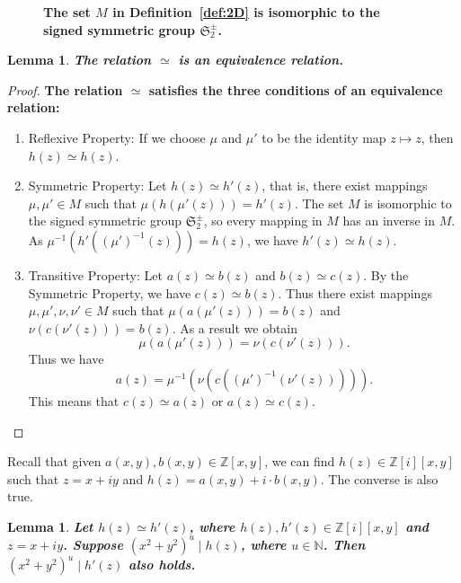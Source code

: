\documentclass[12pt,table]{article}
\newtheorem{lemma}[theorem]{Lemma}
\numberwithin{equation}{section}
\newcommand{\Nnn}{\mathbb N}
\newcommand{\Zzz}{\mathbb Z}
\newcommand{\divides}{\mid}
\begin{document}
\begin{landscape}
{{\begin{figure}[h]
\begin{center}
\end{center}

\caption{
\bf
The set $M$ in Definition~\ref{def:2D} is isomorphic to
the signed symmetric group $ \mathfrak{S}_2^\pm $.
}
 
\label{fig:2D_transformations}
 
\end{figure}



\begin{lemma}
\bf
The relation $ \simeq $ is an equivalence relation.
\end{lemma}

\begin{proof}
\bf
The relation $ \simeq $ satisfies the three conditions of an equivalence relation:
\begin{enumerate}
\item Reflexive Property: If we choose $ \mu $ and $ \mu'$ to be the identity map $ z \mapsto z $, 
then $ h(z) \simeq h(z) $.

\item Symmetric Property: Let  $ h(z) \simeq h'(z) $, that is, there exist mappings 
$ \mu, \mu' \in M $
such that $ \mu( h( \mu'( z ) ) )  = h'(z) $.
The set $M$ is isomorphic to the signed symmetric group $ \mathfrak{S}_2^\pm $,
so every mapping in $M$
has an inverse in $M$. As  $ \mu^{-1}( h'( (\mu')^{-1}( z ) ) )  = h(z) $,
we have $ h'(z) \simeq h(z) $.

\item Transitive Property: Let $ a(z) \simeq b(z) $ and $ b(z) \simeq c(z) $. By the 
Symmetric Property, we have $ c(z) \simeq b(z) $. Thus there exist mappings
$ \mu, \mu', \nu, \nu' \in M $ such that $ \mu( a( \mu'( z ) ) )  = b(z) $ and 
$ \nu( c( \nu'( z ) ) )  = b(z) $. As a result we obtain
\[
\mu( a( \mu'( z ) ) ) = \nu( c( \nu'( z ) ) ). 
\]
Thus we have
\[
a(  z  ) = \mu^{-1}( \nu( c( (\mu')^{-1}( \nu'( z ) ) ) ) ).
\]
This means that $ c(z) \simeq a(z) $ or $ a(z) \simeq c(z) $. \qedhere
\end{enumerate}
\end{proof}

Recall that given $ a(x,y), b(x,y) \in \Zzz[x,y] $,
we can find $ h(z) \in \Zzz [i][x,y] $
such that
$ z = x + iy $
and
$ h(z) = a(x,y) + i \cdot b(x,y) $. 
The converse is also true.



\begin{lemma}
\bf
Let $ h(z) \simeq h'(z) $, where $ h(z), h'(z) \in \Zzz[i][x,y] $
and $ z = x+ iy $.
Suppose $ ( x^2 + y^2 ) ^ u \divides h(z) $,
where $ u \in \Nnn $. Then $ ( x^2 + y^2 ) ^ u \divides h'(z) $ also holds.
\end{lemma}
   
}}
\end{landscape}
\end{document}
